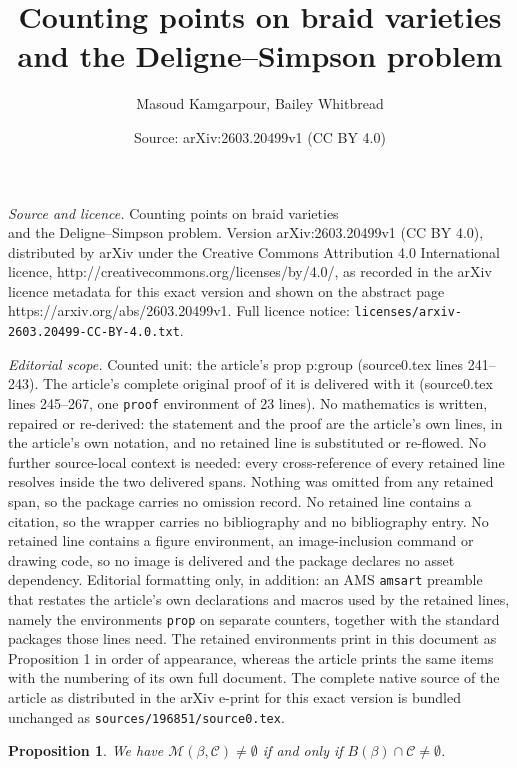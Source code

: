 \documentclass[10pt,a4paper]{amsart}
\title{Counting points on braid varieties\\ and the Deligne--Simpson problem}
\author{Masoud Kamgarpour, Bailey Whitbread}
\date{Source: arXiv:2603.20499v1 (CC BY 4.0)}
\newtheorem{prop}{Proposition}
\newcommand{\cC}{\mathcal{C}}
\newcommand{\cM}{\mathcal{M}}
\begin{document}
\maketitle

\noindent\emph{Source and licence.} Counting points on braid varieties\\ and the Deligne--Simpson problem. Version arXiv:2603.20499v1 (CC BY 4.0), distributed by arXiv under the Creative Commons Attribution 4.0 International licence, http://creativecommons.org/licenses/by/4.0/, as recorded in the arXiv licence metadata for this exact version and shown on the abstract page https://arxiv.org/abs/2603.20499v1. Full licence notice: \texttt{licenses/arxiv-2603.20499-CC-BY-4.0.txt}.\par\smallskip

\noindent\textit{Editorial scope.} Counted unit: the article's prop p:group (source0.tex lines 241--243). The article's complete original proof of it is delivered with it (source0.tex lines 245--267, one \texttt{proof} environment of 23 lines). No mathematics is written, repaired or re-derived: the statement and the proof are the article's own lines, in the article's own notation, and no retained line is substituted or re-flowed.  No further source-local context is needed: every cross-reference of every retained line resolves inside the two delivered spans.  Nothing was omitted from any retained span, so the package carries no omission record.  No retained line contains a citation, so the wrapper carries no bibliography and no bibliography entry.  No retained line contains a figure environment, an image-inclusion command or drawing code, so no image is delivered and the package declares no asset dependency.  Editorial formatting only, in addition: an AMS \texttt{amsart} preamble that restates the article's own declarations and macros used by the retained lines, namely the environments \texttt{prop} on separate counters, together with the standard packages those lines need.  The retained environments print in this document as Proposition 1 in order of appearance, whereas the article prints the same items with the numbering of its own full document.  The complete native source of the article as distributed in the arXiv e-print for this exact version is bundled unchanged as \texttt{sources/196851/source0.tex}.
\begin{prop}\label{p:group}
We have $\cM(\beta,\cC)\neq\emptyset$ if and only if $B(\beta)\cap \cC\neq\emptyset$.
\end{prop}
\end{document}
